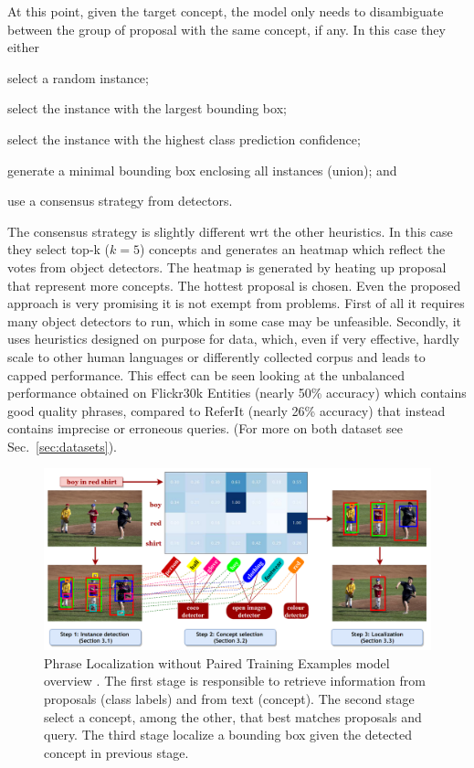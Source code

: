 At this point, given the target concept, the model only needs to
disambiguate between the group of proposal with the same concept, if
any. In this case they either
\begin{enumerate*}[label=(\roman*)] 
  \item select a random instance;
  \item select the instance with the largest bounding box; 
  \item select the instance with the highest class prediction
  confidence;
  \item generate a minimal bounding box enclosing all instances
  (union); and
  \item use a consensus strategy from detectors.
\end{enumerate*} 
The consensus strategy is slightly different wrt the other heuristics.
In this case they select top-k ($k = 5$) concepts and generates an
heatmap which reflect the votes from object detectors. The heatmap is
generated by heating up proposal that represent more concepts. The
hottest proposal is chosen. Even the proposed approach is very
promising it is not exempt from problems. First of all it requires
many object detectors to run, which in some case may be unfeasible.
Secondly, it uses heuristics designed on purpose for data, which, even
if very effective, hardly scale to other human languages or
differently collected corpus and leads to capped performance. This
effect can be seen looking at the unbalanced performance obtained on
Flickr30k Entities (nearly 50\% accuracy) which contains good quality
phrases, compared to ReferIt (nearly 26\% accuracy) that instead
contains imprecise or erroneous queries. (For more on both dataset see
Sec.~\ref{sec:datasets}). 

\begin{figure}
  \centering
  \includegraphics[width=.8\textwidth]{figures/phraseloc-model.png}
  \caption[Phrase Localization without Paired Training Examples model
  overview]{Phrase Localization without Paired Training Examples model
  overview \cite{wang2019phrase}. The first stage is responsible to
  retrieve information from proposals (class labels) and from text
  (concept). The second stage select a concept, among the other, that
  best matches proposals and query. The third stage localize a
  bounding box given the detected concept in previous stage.}
  \label{fig:phraseloc-model}
\end{figure}

